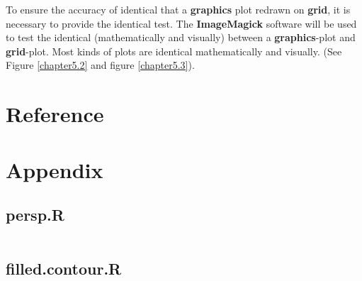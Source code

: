 \documentclass[paper=a4, fontsize=11pt]{report}
\begin{document}
To ensure the accuracy of identical that a \textbf{graphics} plot redrawn on \textbf{grid}, it is necessary to provide the identical test. The \textbf{ImageMagick} software will be used to test the identical (mathematically and visually) between a \textbf{graphics}-plot and \textbf{grid}-plot. Most kinds of plots are identical mathematically and visually. (See Figure \ref{chapter5.2} and figure \ref{chapter5.3}).



\chapter{Reference}
  \nocite{Rref}
  
  
\chapter{Appendix}
\section{persp.R}
\begin{lstlisting}

\end{lstlisting}
\section{filled.contour.R}
\end{document}
